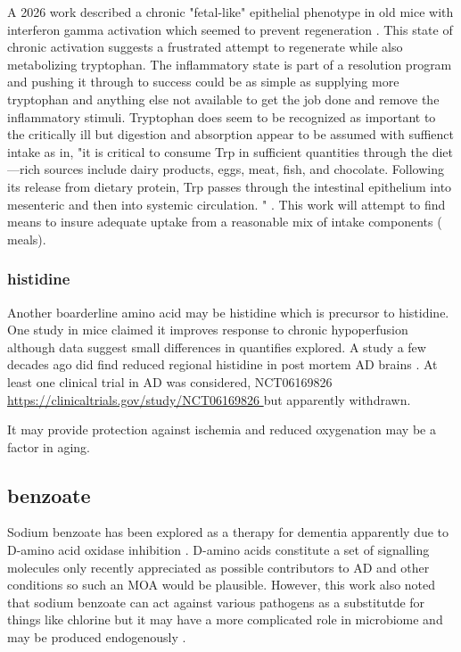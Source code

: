 A 2026 work described a chronic "fetal-like"
epithelial phenotype in old mice with interferon gamma activation which 
seemed to prevent regeneration \cite{PMID42007500}.
This state of chronic activation suggests a frustrated
attempt to regenerate while also metabolizing tryptophan.
The inflammatory state is part of a resolution program
and pushing it through to success could be as simple
as supplying more tryptophan and anything else
not available to get the job done and remove
the inflammatory stimuli. 
Tryptophan does seem to be
recognized as important to the critically ill
but digestion and absorption appear to be assumed
with suffienct intake 
as in, "it is critical to consume Trp in sufficient quantities through the diet—rich sources include dairy products, eggs, meat, fish, and chocolate. Following its release from dietary protein, Trp passes through the intestinal epithelium into mesenteric and then into systemic circulation. "
\cite{Kanova_Kohout_Tryptophan_Unique_Role_2021}.
This work will attempt to find means to insure adequate 
uptake from a reasonable mix of intake components ( meals).



\subsubsection{histidine}
Another boarderline amino acid may be histidine which
is  precursor to histidine.
One  study in mice claimed it improves
response to chronic hypoperfusion 
\cite{Song_Yang_Nan_Histidine_Alleviates_Impairments_Induced_2018}
although data suggest small differences in quantifies explored. 
A study a few decades ago did find reduced regional
histidine in post mortem AD brains
\cite{MazurkiewiczKwilecki_Nsonwah_Changes_regional_1989}.
At least one clinical trial in AD was considered,
NCT06169826
{\url{https://clinicaltrials.gov/study/NCT06169826 }}
but apparently withdrawn.

It may provide protection against ischemia
\cite{Liao_Jiang_Wang_Histidine_provides_long_term_2015}
and reduced oxygenation may be a factor in aging.



\subsection{benzoate}

Sodium benzoate has been explored as a therapy for dementia
apparently due to D-amino acid oxidase inhibition
\cite{Lin_Wang_Lane_Sodium_benzoate_Damino_2025}.
D-amino acids constitute a set of signalling molecules
only recently appreciated as possible contributors to AD
and other conditions
\cite{deOliveiraSouza_Roychaudhuri_Belleroche_Amino_acids_2023}
 so such an MOA would be plausible. However, this work
also noted that sodium benzoate can act against various
pathogens as a substitutde for things like chlorine
\cite{Chen_Zhong_Antibacterial_activity_acidified_2018}
but it may have a more complicated role in microbiome
and may be produced endogenously 
\cite{Hertel_Fassler_Heinken_Metabolomics_Reveal_Urine_2022}.
 
